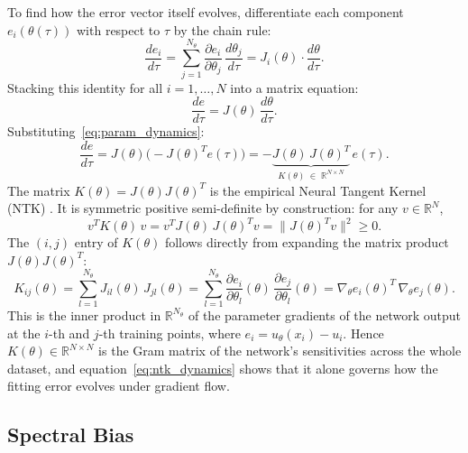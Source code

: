 To find how the error vector itself evolves, differentiate each component $e_i(\theta(\tau))$ with respect to $\tau$ by the chain rule:
\begin{equation}
    \frac{de_i}{d\tau}
    = \sum_{j=1}^{N_\theta} \frac{\partial e_i}{\partial \theta_j}\,\frac{d\theta_j}{d\tau}
    = J_i(\theta)\cdot\frac{d\theta}{d\tau}.
\end{equation}
Stacking this identity for all $i = 1,\ldots,N$ into a matrix equation:
\begin{equation}
    \frac{de}{d\tau} = J(\theta)\,\frac{d\theta}{d\tau}.
\end{equation}
Substituting~\eqref{eq:param_dynamics}:
\begin{equation}\label{eq:ntk_dynamics}
    \frac{de}{d\tau}
    = J(\theta)\bigl(-J(\theta)^T e(\tau)\bigr)
    = -\underbrace{J(\theta)\,J(\theta)^T}_{K(\theta)\;\in\;\mathbb{R}^{N\times N}}\,e(\tau).
\end{equation}
The matrix $K(\theta) = J(\theta)J(\theta)^T$ is the empirical Neural Tangent Kernel (NTK) \parencite{jacot2018}. It is symmetric positive semi-definite by construction: for any $v \in \mathbb{R}^{N}$,
\begin{equation}
    v^T K(\theta)\, v = v^T J(\theta)\,J(\theta)^T v = \bigl\|J(\theta)^T v\bigr\|^2 \geq 0.
\end{equation}
The $(i,j)$ entry of $K(\theta)$ follows directly from expanding the matrix product $J(\theta)J(\theta)^T$:
\begin{equation}\label{eq:ntk_entry}
    K_{ij}(\theta)
    = \sum_{l=1}^{N_\theta} J_{il}(\theta)\,J_{jl}(\theta)
    = \sum_{l=1}^{N_\theta} \frac{\partial e_i}{\partial\theta_l}(\theta)\,\frac{\partial e_j}{\partial\theta_l}(\theta)
    = \nabla_\theta e_i(\theta)^T\,\nabla_\theta e_j(\theta).
\end{equation}
This is the inner product in $\mathbb{R}^{N_\theta}$ of the parameter gradients of the network output at the $i$-th and $j$-th training points, where $e_i = u_\theta(x_i) - u_i$. Hence $K(\theta) \in \mathbb{R}^{N \times N}$ is the Gram matrix of the network's sensitivities across the whole dataset, and equation~\eqref{eq:ntk_dynamics} shows that it alone governs how the fitting error evolves under gradient flow.

\subsection{Spectral Bias}
\label{subsec:spectral_bias}

